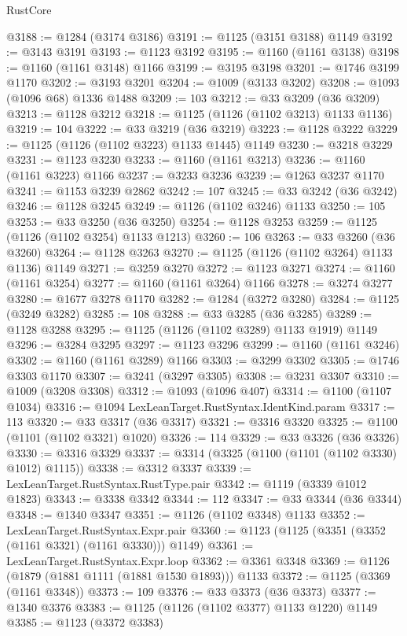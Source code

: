 \begin{lexlean}{RustCore}
\begin{coremodule}
@3188 := @1284 (@3174 @3186)
@3191 := @1125 (@3151 @3188) @1149
@3192 := @3143 @3191
@3193 := @1123 @3192
@3195 := @1160 (@1161 @3138)
@3198 := @1160 (@1161 @3148) @1166
@3199 := @3195 @3198
@3201 := @1746 @3199 @1170
@3202 := @3193 @3201
@3204 := @1009 (@3133 @3202)
@3208 := @1093 (@1096 @68) @1336 @1488
@3209 := 103
@3212 := @33 @3209 (@36 @3209)
@3213 := @1128 @3212
@3218 := @1125 (@1126 (@1102 @3213) @1133 @1136)
@3219 := 104
@3222 := @33 @3219 (@36 @3219)
@3223 := @1128 @3222
@3229 := @1125 (@1126 (@1102 @3223) @1133 @1445) @1149
@3230 := @3218 @3229
@3231 := @1123 @3230
@3233 := @1160 (@1161 @3213)
@3236 := @1160 (@1161 @3223) @1166
@3237 := @3233 @3236
@3239 := @1263 @3237 @1170
@3241 := @1153 @3239 @2862
@3242 := 107
@3245 := @33 @3242 (@36 @3242)
@3246 := @1128 @3245
@3249 := @1126 (@1102 @3246) @1133
@3250 := 105
@3253 := @33 @3250 (@36 @3250)
@3254 := @1128 @3253
@3259 := @1125 (@1126 (@1102 @3254) @1133 @1213)
@3260 := 106
@3263 := @33 @3260 (@36 @3260)
@3264 := @1128 @3263
@3270 := @1125 (@1126 (@1102 @3264) @1133 @1136) @1149
@3271 := @3259 @3270
@3272 := @1123 @3271
@3274 := @1160 (@1161 @3254)
@3277 := @1160 (@1161 @3264) @1166
@3278 := @3274 @3277
@3280 := @1677 @3278 @1170
@3282 := @1284 (@3272 @3280)
@3284 := @1125 (@3249 @3282)
@3285 := 108
@3288 := @33 @3285 (@36 @3285)
@3289 := @1128 @3288
@3295 := @1125 (@1126 (@1102 @3289) @1133 @1919) @1149
@3296 := @3284 @3295
@3297 := @1123 @3296
@3299 := @1160 (@1161 @3246)
@3302 := @1160 (@1161 @3289) @1166
@3303 := @3299 @3302
@3305 := @1746 @3303 @1170
@3307 := @3241 (@3297 @3305)
@3308 := @3231 @3307
@3310 := @1009 (@3208 @3308)
@3312 := @1093 (@1096 @407)
@3314 := @1100 (@1107 @1034)
@3316 := @1094 LexLeanTarget.RustSyntax.IdentKind.param
@3317 := 113
@3320 := @33 @3317 (@36 @3317)
@3321 := @3316 @3320
@3325 := @1100 (@1101 (@1102 @3321) @1020)
@3326 := 114
@3329 := @33 @3326 (@36 @3326)
@3330 := @3316 @3329
@3337 := @3314 (@3325 (@1100 (@1101 (@1102 @3330) @1012) @1115))
@3338 := @3312 @3337
@3339 := LexLeanTarget.RustSyntax.RustType.pair
@3342 := @1119 (@3339 @1012 @1823)
@3343 := @3338 @3342
@3344 := 112
@3347 := @33 @3344 (@36 @3344)
@3348 := @1340 @3347
@3351 := @1126 (@1102 @3348) @1133
@3352 := LexLeanTarget.RustSyntax.Expr.pair
@3360 := @1123 (@1125 (@3351 (@3352 (@1161 @3321) (@1161 @3330))) @1149)
@3361 := LexLeanTarget.RustSyntax.Expr.loop
@3362 := @3361 @3348
@3369 := @1126 (@1879 (@1881 @1111 (@1881 @1530 @1893))) @1133
@3372 := @1125 (@3369 (@1161 @3348))
@3373 := 109
@3376 := @33 @3373 (@36 @3373)
@3377 := @1340 @3376
@3383 := @1125 (@1126 (@1102 @3377) @1133 @1220) @1149
@3385 := @1123 (@3372 @3383)

\end{coremodule}
\end{lexlean}
